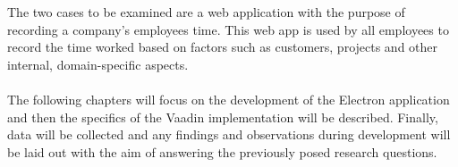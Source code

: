 
The two cases to be examined are a web application with the purpose of recording a company's employees
time. 
This web app is used by all employees to record the time worked based on factors such as customers, projects and other
internal, domain-specific aspects.\paragraph{}
The following chapters will focus on the development of the Electron application and then the specifics of 
the Vaadin implementation will be described. 
Finally, data will be collected and any findings and observations during development will be laid out with
the aim of answering the previously posed research questions. \paragraph{}